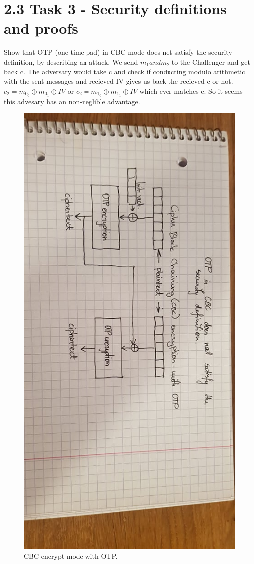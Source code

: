 \documentclass{article}
\begin{document}
\pagebreak
\section{2.3 Task 3 - Security definitions and proofs} 
Show that OTP (one time pad) in CBC mode does not satisfy the security definition, by describing an attack.
We send $m_1 and m_2$ to the Challenger and get back c. The adversary would take c and check if conducting modulo arithmetic
with the sent messages and recieved IV gives us back the recieved c or not.
$c_2 = m_{0_0} \oplus m_{0_1} \oplus IV$ or $c_2 = m_{1_0} \oplus m_{1_1} \oplus IV$ which ever matches c. So it seems 
this advesary has an non-neglible advantage.
\begin{figure}[H]
    \centering
    \label{fig:dh}
    \includegraphics[scale=0.5, angle=90]{cbc_enc.jpg}
    \caption{CBC encrypt mode with OTP.}
\end{figure}
\end{document}

